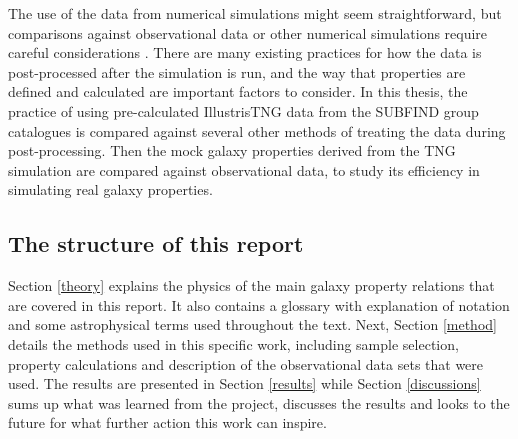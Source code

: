The use of the data from numerical simulations might seem straightforward, but comparisons against observational data or other numerical simulations require careful considerations \parencite[see e.g.,][]{Sande2018, Schaye2015, Pillepich2017}. There are many existing practices for how the data is post-processed after the simulation is run, and the way that properties are defined and calculated are important factors to consider. In this thesis, the practice of using pre-calculated IllustrisTNG data from the SUBFIND group catalogues is compared against several other methods of treating the data during post-processing. Then the mock galaxy properties derived from the TNG simulation are compared against observational data, to study its efficiency in simulating real galaxy properties.

\subsection{The structure of this report}
Section \ref{theory} explains the physics of the main galaxy property relations that are covered in this report. It also contains a glossary with explanation of notation and some astrophysical terms used throughout the text. Next, Section \ref{method} details the methods used in this specific work, including sample selection, property calculations and description of the observational data sets that were used. The results are presented in Section \ref{results} while Section \ref{discussions} sums up what was learned from the project, discusses the results and looks to the future for what further action this work can inspire.
